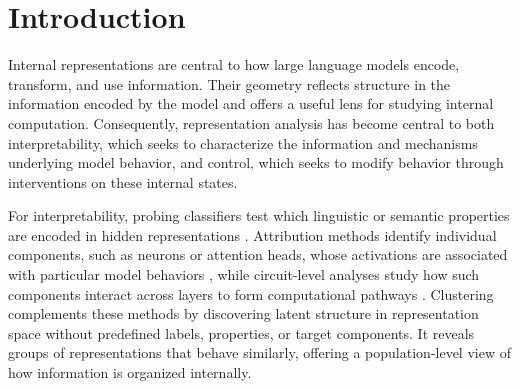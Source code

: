 \documentclass[11pt]{article}
\begin{document}







\section{Introduction}

Internal representations are central to how large language models encode, transform, and use information. Their geometry reflects structure in the information encoded by the model and offers a useful lens for studying internal computation. Consequently, representation analysis has become central to both interpretability, which seeks to characterize the information and mechanisms underlying model behavior, and control, which seeks to modify behavior through interventions on these internal states.

For interpretability, probing classifiers test which linguistic or semantic properties are encoded in hidden representations \citep{tenney2019what,belinkov2022probing}. Attribution methods identify individual components, such as neurons or attention heads, whose activations are associated with particular model behaviors \citep{sajjad2022neuron,dai2022knowledge,meng2022locating}, while circuit-level analyses study how such components interact across layers to form computational pathways \citep{wang2023interpretability}.
Clustering complements these methods by discovering latent structure in representation space without predefined labels, properties, or target components. It reveals groups of representations that behave similarly, offering a population-level view of how information is organized internally.
\end{document}
